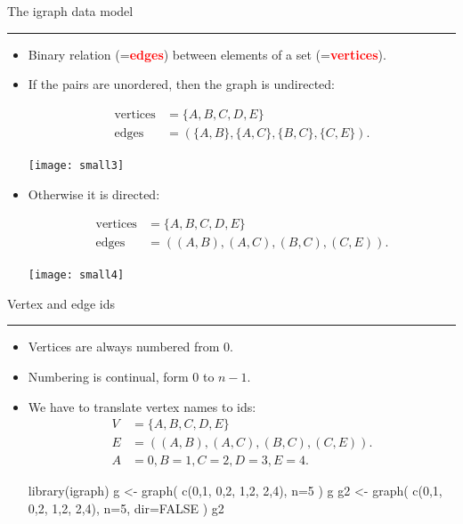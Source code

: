 \documentclass[landscape,fleqno]{foils}
\newcommand{\stitle}[1]{{\color{blue}\Large #1\par\vspace*{10pt}\hrule}}
\renewcommand{\emph}[1]{\textcolor{red}{\bf #1}}
\newenvironment{narrow}[2]{%
  \begin{list}{}{%
      \setlength{\topsep}{0pt}%
      \setlength{\leftmargin}{#1}%
      \setlength{\rightmargin}{#2}%
      \setlength{\listparindent}{\parindent}%
      \setlength{\itemindent}{\parindent}%
      \setlength{\parsep}{\parskip}}%
    \item[]}{\end{list}}
\begin{document}
\newpage
\stitle{The igraph data model}
\begin{itemize}
\item Binary relation (=\emph{edges}) between elements of a set
  (=\emph{vertices}). \pause\\[-15pt]
\item If the pairs are unordered, then the graph is undirected:\\[-20pt]

  \begin{minipage}{0.7\textwidth}
    \begin{align} 
      \text{vertices} & =\{A,B,C,D,E\} \nonumber\\
      \text{edges}    & =( \{A,B\},\{A,C\},\{B,C\},\{C,E\} ). \nonumber
    \end{align}
  \end{minipage}\begin{minipage}{0.3\textwidth}
    \texttt{[image: small3]}
  \end{minipage}\pause
\item Otherwise it is directed:\\[-20pt]

  \begin{minipage}{0.7\textwidth}
    \begin{align} 
      \text{vertices} & =\{A,B,C,D,E\} \nonumber\\
      \text{edges}    & =( (A,B),(A,C),(B,C),(C,E) ). \nonumber
    \end{align}
  \end{minipage}\begin{minipage}{0.3\textwidth}
    \texttt{[image: small4]}
  \end{minipage}
\end{itemize}

\newpage
\stitle{Vertex and edge ids}
\begin{narrow}{0cm}{13.5cm}
\begin{itemize}
\item Vertices are always numbered from 0.
\item Numbering is continual, form 0 to $n-1$. \pause
\item We have to translate vertex names to ids: 
\begin{align} 
  V & =\{A,B,C,D,E\} \nonumber\\
  E & =( (A,B),(A,C),(B,C),(C,E) ). \nonumber\\
  A & =0, B=1, C=2, D=3, E=4. \nonumber
\end{align}\vspace*{-2cm}\pause
\begin{Myverb}
  library(igraph)
  g <- graph( c(0,1, 0,2, 1,2, 2,4), n=5 )
  g
  g2 <- graph( c(0,1, 0,2, 1,2, 2,4), 
               n=5, dir=FALSE )
  g2
\end{Myverb}
\end{itemize}
\end{narrow}
\end{document}
